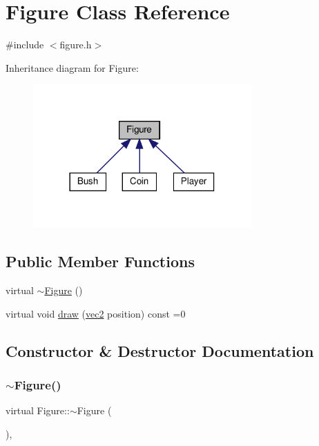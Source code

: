 \hypertarget{classFigure}{}\section{Figure Class Reference}
\label{classFigure}


{\ttfamily \#include $<$figure.\+h$>$}



Inheritance diagram for Figure\+:
\nopagebreak
\begin{figure}[H]
\begin{center}
\leavevmode
\includegraphics[width=237pt]{dc/db1/classFigure__inherit__graph}
\end{center}
\end{figure}
\subsection*{Public Member Functions}
\begin{DoxyCompactItemize}
\item 
virtual \hyperlink{classFigure_a654f8f4944edcfb248fb86b77b8b21d3}{$\sim$\+Figure} ()
\item 
virtual void \hyperlink{classFigure_ac16583e764bdc244076957bf775e4866}{draw} (\hyperlink{structvec2}{vec2} position) const =0
\end{DoxyCompactItemize}


\subsection{Constructor \& Destructor Documentation}
\mbox{\label{classFigure_a654f8f4944edcfb248fb86b77b8b21d3}} 
\subsubsection{\texorpdfstring{$\sim$\+Figure()}{~Figure()}}
{\footnotesize\ttfamily virtual Figure\+::$\sim$\+Figure (\begin{DoxyParamCaption}{ }\end{DoxyParamCaption})\hspace{0.3cm}{\ttfamily [inline]}, {\ttfamily [virtual]}}



